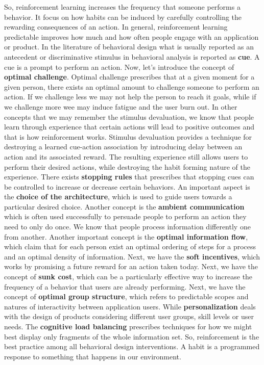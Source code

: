 \documentclass[11pt]{article}
\begin{document}
So, reinforcement learning increases the frequency that someone performs a behavior. It focus on how habits can be induced by carefully controlling the rewarding consequences of an action. In general, reinforcement learning predictable improves how much and how often people engage with an application or product. In the literature of behavioral design what is usually reported as an antecedent or discriminative stimulus in behavioral analysis is reported as \textbf{cue}. A cue is a prompt to perform an action. Now, let's introduce the concept of \textbf{optimal challenge}. Optimal challenge prescribes that at a given moment for a given person, there exists an optimal amount to challenge someone to perform an action. If we challenge less we may not help the person to reach it goals, while if we challenge more wee may induce fatigue and the user burn out. In other concepts that we may remember the stimulus devaluation, we know that people learn through experience that certain actions will lead to positive outcomes and that is how reinforcement works. Stimulus devaluation provides a technique for destroying a learned cue-action association by introducing delay between an action and its associated reward. The resulting experience still allows users to perform their desired actions, while destroying the habit forming nature of the experience. There exists \textbf{stopping rules} that prescribes that stopping cues can be controlled to increase or decrease certain behaviors. An important aspect is the \textbf{choice of the architecture}, which is used to guide users towards a particular desired choice. Another concept is the \textbf{ambient communication} which is often used successfully to persuade people to perform an action they need to only do once. We know that people process information differently one from another. Another important concept is the \textbf{optimal information flow}, which claim that for each person exist an optimal ordering of steps for a process and an optimal density of information. Next, we have the \textbf{soft incentives}, which works by promising a future reward for an action taken today. Next, we have the concept of \textbf{sunk cost}, which can be a particularly effective way to increase the frequency of a behavior that users are already performing. Next, we have the concept of \textbf{optimal group structure}, which refers to predictable scopes and natures of interactivity between application users. While \textbf{personalization} deals with the design of products considering different user groups, skill levels or user needs. The \textbf{cognitive load balancing} prescribes techniques for how we might best display only fragments of the whole information set. So, reinforcement is the best practice among all behavioral design interventions. A habit is a programmed response to something that happens in our environment. 
\end{document}
